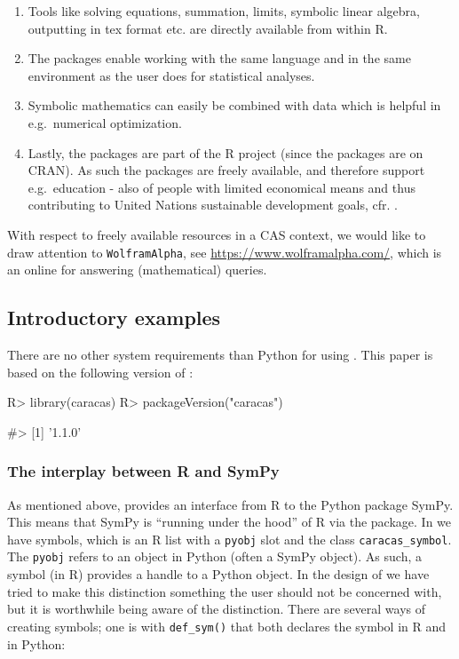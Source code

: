 \begin{enumerate}
\def\labelenumi{\arabic{enumi}.}
\item
  Tools like solving equations, summation, limits, symbolic linear
  algebra, outputting in tex format etc. are directly available from
  within R.
\item
  The packages enable working with the same language and in the same
  environment as the user does for statistical analyses.
\item
  Symbolic mathematics can easily be combined with data which is helpful
  in e.g.~numerical optimization.
\item
  Lastly, the packages are part of the R project (since the packages are
  on CRAN). As such the packages are freely available, and therefore
  support e.g.~education - also of people with limited economical means
  and thus contributing to United Nations sustainable development goals,
  cfr. \citet{UN17}.
\end{enumerate}

With respect to freely available resources in a CAS context, we would
like to draw attention to \texttt{WolframAlpha}, see
\url{https://www.wolframalpha.com/}, which is an online for answering
(mathematical) queries.

\hypertarget{introductory-examples}{%
\subsection{Introductory examples}\label{introductory-examples}}

There are no other system requirements than Python for using
. This paper is based on the following version of
:

\begin{Schunk}
\begin{Sinput}
R> library(caracas)
R> packageVersion("caracas")
\end{Sinput}
\begin{Soutput}
#> [1] '1.1.0'
\end{Soutput}
\end{Schunk}

\hypertarget{the-interplay-between-r-and-sympy}{%
\subsubsection{The interplay between R and
SymPy}\label{the-interplay-between-r-and-sympy}}

As mentioned above,  provides an interface from R to
the Python package SymPy. This means that SymPy is ``running under the
hood'' of R via the  package. In 
we have symbols, which is an R list with a \texttt{pyobj} slot and the
class \texttt{caracas\_symbol}. The \texttt{pyobj} refers to an object
in Python (often a SymPy object). As such, a symbol (in R) provides a
handle to a Python object. In the design of  we have
tried to make this distinction something the user should not be
concerned with, but it is worthwhile being aware of the distinction.
There are several ways of creating symbols; one is with
\texttt{def\_sym()} that both declares the symbol in R and in Python:

